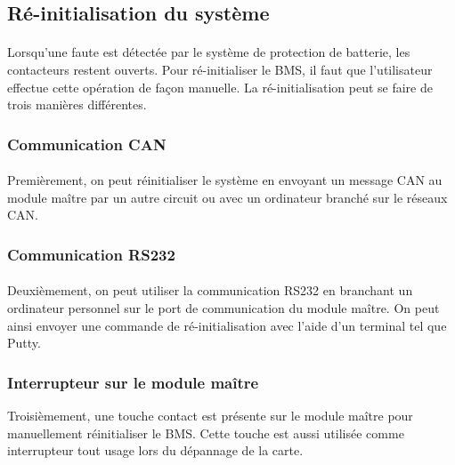 \subsection{Ré-initialisation du système}

	\paragraph*{}
	Lorsqu'une faute est détectée par le système de protection de batterie, les contacteurs restent ouverts. Pour ré-initialiser le BMS, il faut que l'utilisateur effectue cette opération de façon manuelle. La ré-initialisation peut se faire de trois manières différentes.
		
	\subsubsection{Communication CAN}
		\paragraph*{}
		Premièrement, on peut réinitialiser le système en envoyant un message CAN au module maître par un autre circuit ou avec un ordinateur branché sur le réseaux CAN. 

	\subsubsection{Communication RS232}
		\paragraph*{}	
		Deuxièmement, on peut utiliser la communication RS232 en branchant un ordinateur personnel sur le port de communication du module maître. On peut ainsi envoyer une commande de ré-initialisation avec l'aide d'un terminal tel que Putty.
				
	\subsubsection{Interrupteur sur le module maître}
		Troisièmement, une touche contact est présente sur le module maître pour manuellement réinitialiser le BMS. Cette touche est aussi utilisée comme interrupteur tout usage lors du dépannage de la carte.